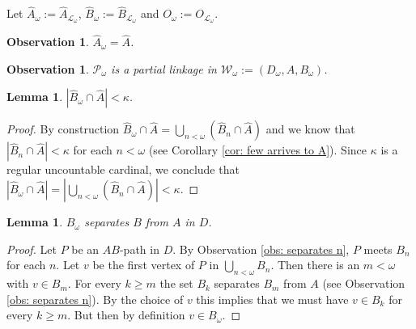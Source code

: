 \documentclass[12pt,a4paper]{amsart}
\theoremstyle{plain}
\newtheorem{lemma}[theorem]{Lemma}
\newtheorem{observation}[theorem]{Observation}
\theoremstyle{definition}
\begin{document}
 Let $  \widehat{A}_\omega:=\widehat{A}_{\mathcal{L}_\omega}$, $  
 \widehat{B}_\omega:=\widehat{B}_{\mathcal{L}_\omega}$  and $ O_\omega:=O_{\mathcal{L}_\omega} $.
\begin{observation}\label{obs: hat omega}
$ \widehat{A}_\omega=\widehat{A} $.
\end{observation}
\begin{observation}
$ \mathcal{P}_\omega $ is a partial linkage in $ \mathcal{W}_\omega:=(D_\omega,A,B_\omega) $.
\end{observation}
\begin{lemma}\label{lem: B omega in A small}
$ \left|\widehat{B}_\omega \cap \widehat{A}\right|<\kappa $.
\end{lemma}
\begin{proof}
By construction $ \widehat{B}_\omega \cap \widehat{A}=\bigcup_{n<\omega}(\widehat{B}_n \cap \widehat{A})  $ and we 
know that    $ \left|\widehat{B}_n \cap 
\widehat{A}\right|<\kappa $ for each $ n<\omega $ (see Corollary \ref{cor: few arrives to A}). Since $ 
\kappa $ is a 
regular uncountable cardinal, we conclude that $\left| \widehat{B}_\omega \cap \widehat{A}\right|= 
\left|\bigcup_{n<\omega}(\widehat{B}_n \cap \widehat{A})\right|<\kappa $. 
\end{proof}
\begin{lemma}\label{lem: B omega separates}
$ B_\omega $ separates $ B $ from $ A $ in $ D $.
\end{lemma}
\begin{proof}
Let $ P $ be an $ AB $-path in $ D $. By Observation \ref{obs: separates n},  $ P $ meets $ B_n $ for each $ n $. Let $ 
v $ be 
the 
first vertex of $ P $ in $ 
\bigcup_{n<\omega}B_n $. Then there is an $ m<\omega $ with $ v\in B_m $. For 
every $ k \geq m $ the set $ B_k $ separates $ B_m $ from $ A $ (see Observation \ref{obs: separates n}). By the choice of $ v $ this implies that 
we must have $ v\in B_k $ for every $ k \geq m $. But then by definition $ v\in B_\omega $.
\end{proof}
\end{document}
